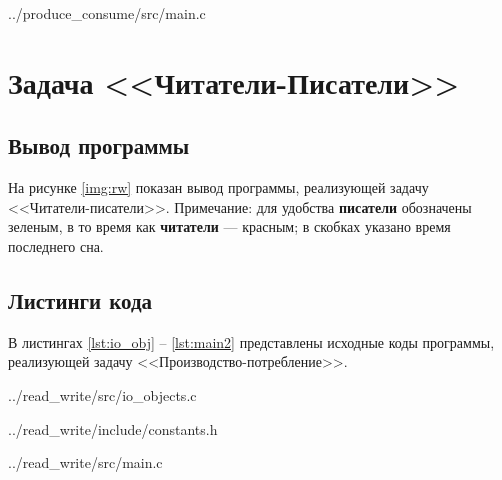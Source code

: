 \begin{lstinputlisting}[
        caption={Главный файл программы},
        label={lst:main1},
        linerange={1},
        style={cstyle}
    ]{../produce_consume/src/main.c}
\end{lstinputlisting}

\chapter{Задача <<Читатели-Писатели>>}

\section{Вывод программы}

На рисунке \ref{img:rw} показан вывод программы, реализующей задачу <<Читатели-писатели>>. Примечание: для удобства \textbf{\color{forestgreen}писатели} обозначены зеленым, в то время как \textbf{\color{red}читатели} --- красным; в скобках указано время последнего сна.


\section{Листинги кода}

В листингах \ref{lst:io_obj} -- \ref{lst:main2} представлены исходные коды программы, реализующей задачу <<Производство-потребление>>.

\begin{lstinputlisting}[
        caption={Реализация ``читателей'' и ``писателей''},
        label={lst:io_obj},
        linerange={1},
        style={cstyle}
    ]{../read_write/src/io_objects.c}
\end{lstinputlisting}

\begin{lstinputlisting}[
        caption={Файл с константными значениями},
        label={lst:constants2},
        linerange={1},
        style={cstyle}
    ]{../read_write/include/constants.h}
\end{lstinputlisting}

\begin{lstinputlisting}[
        caption={Главный файл программы},
        label={lst:main2},
        linerange={1},
        style={cstyle}
    ]{../read_write/src/main.c}
\end{lstinputlisting}
